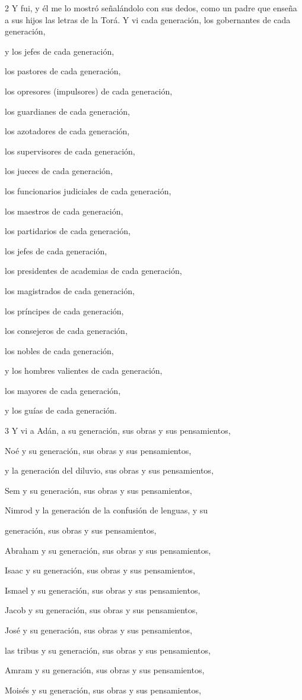 \par 2 Y fui, y él me lo mostró señalándolo con sus dedos, como un padre que enseña a sus hijos las letras de la Torá. Y vi cada generación, los gobernantes de cada generación,
\par y los jefes de cada generación,
\par los pastores de cada generación,
\par los opresores (impulsores) de cada generación,
\par los guardianes de cada generación,
\par los azotadores de cada generación,
\par los supervisores de cada generación,
\par los jueces de cada generación,
\par los funcionarios judiciales de cada generación,
\par los maestros de cada generación,
\par los partidarios de cada generación,
\par los jefes de cada generación,
\par los presidentes de academias de cada generación,
\par los magistrados de cada generación,
\par los príncipes de cada generación,
\par los consejeros de cada generación,
\par los nobles de cada generación,
\par y los hombres valientes de cada generación,
\par los mayores de cada generación,
\par y los guías de cada generación.

\par 3 Y vi a Adán, a su generación, sus obras y sus pensamientos,
\par Noé y su generación, sus obras y sus pensamientos,
\par y la generación del diluvio, sus obras y sus pensamientos,
\par Sem y su generación, sus obras y sus pensamientos,
\par Nimrod y la generación de la confusión de lenguas, y su
\par generación, sus obras y sus pensamientos,
\par Abraham y su generación, sus obras y sus pensamientos,
\par Isaac y su generación, sus obras y sus pensamientos,
\par Ismael y su generación, sus obras y sus pensamientos,
\par Jacob y su generación, sus obras y sus pensamientos,
\par José y su generación, sus obras y sus pensamientos,
\par las tribus y su generación, sus obras y sus pensamientos,
\par Amram y su generación, sus obras y sus pensamientos,
\par Moisés y su generación, sus obras y sus pensamientos,

